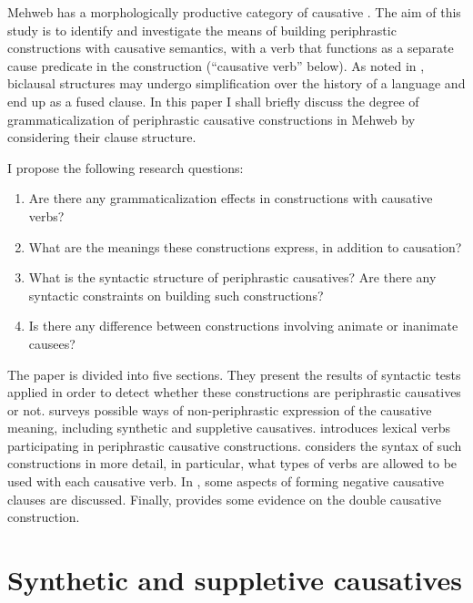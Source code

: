 ﻿\documentclass[output=paper]{langsci/langscibook}
\begin{document}
{
Mehweb has a morphologically productive category of
causative \citep{ageeva2014,daniel2019}. The aim of this study is to
identify and investigate the means of building periphrastic
constructions with causative semantics, with a verb that functions as a
separate cause predicate in the construction (``causative verb'' below). As
noted in \citet[151–194]{harris-campbell1995}, biclausal structures may
undergo simplification over the history of a language and end up as a
fused clause. In this paper I shall briefly discuss the degree of
grammaticalization of periphrastic causative constructions in Mehweb by
considering their clause structure.}

I propose the following research questions:

\begin{enumerate}[topsep=\medskipamount,itemsep=0pt,partopsep=0pt,parsep=0pt]
\item
  Are there any grammaticalization effects in constructions with
  causative verbs?
\item
  What are the meanings these constructions express, in addition to
  causation?
\item
  What is the syntactic structure of periphrastic causatives? Are there
  any syntactic constraints on building such constructions?
\item
  Is there any difference between constructions involving animate or
  inanimate causees?
\end{enumerate}

The paper is divided into five sections. They present the results of
syntactic tests applied in order to detect whether these constructions
are periphrastic causatives or not.  surveys  possible ways
of non-periphrastic expression of the causative meaning, including
synthetic and suppletive causatives.  introduces lexical verbs
participating in periphrastic causative constructions. 
considers the syntax of such constructions in more detail, in
particular, what types of verbs are allowed to be used with each
causative verb. In , some aspects of forming negative causative
clauses are discussed. Finally,  provides some evidence on the double
causative construction.

\section{Synthetic and suppletive causatives}\label{Synthetic-and-suppletive-causatives}
\end{document}
